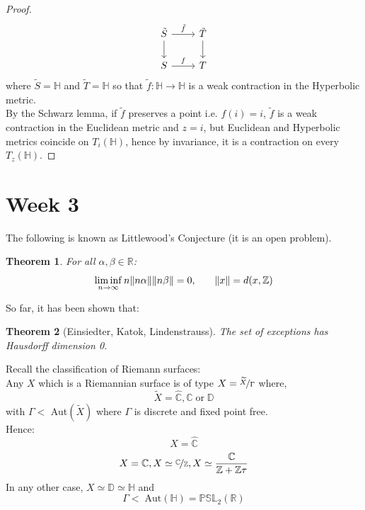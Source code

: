 \documentclass[a4paper, 11pt]{book}
\newtheorem{theorem}{Theorem}
\theoremstyle{definition}
\theoremstyle{remark}
\begin{document}
    \begin{proof}
        \begin{equation*}
            \begin{tikzcd}
                \tilde{S} \arrow{r}{\tilde{f}} \arrow{d} & \tilde{T} \arrow{d} \\
                S \arrow{r}{f} & T
            \end{tikzcd}
        \end{equation*}
        where $\tilde{S}=\mathbb{H}$ and $\tilde{T}=\mathbb{H}$ so that $\widetilde{f}: \mathbb{H}\to\mathbb{H}$ is 
        a weak contraction in the Hyperbolic metric.\\

        By the Schwarz lemma, if $\widetilde{f}$ preserves a point i.e. $f(i)=i$, $\widetilde{f}$ is a weak contraction in the
        Euclidean metric and $z=i$, but Euclidean and Hyperbolic metrics coincide on $T_i(\mathbb{H})$, hence by invariance, it is
        a contraction on every $T_z(\mathbb{H})$.
    \end{proof}

    \section{Week 3}

    The following is known as Littlewood's Conjecture (it is an open problem).
    \begin{theorem}
        For all $\alpha,\beta\in\mathbb{R}$:
        \[ \liminf_{n\to\infty} n\norm{n\alpha}\norm{n\beta} = 0,\qquad \norm{x} = d(x,\mathbb{Z}) \]
    \end{theorem}

    So far, it has been shown that:
    \begin{theorem}[Einsiedter, Katok, Lindenstrauss]
        The set of exceptions has Hausdorff dimension 0.
    \end{theorem}

    Recall the classification of Riemann surfaces:\\

    Any $X$ which is a Riemannian surface is of type $X=\nicefrac{\widetilde{X}}{\Gamma}$ where,
    \[ \widetilde{X} = \hat{\mathbb{C}},\mathbb{C}\;\text{or}\;\mathbb{D} \]
    with $\Gamma <$ Aut$(\widetilde{X})$ where $\Gamma$ is discrete and fixed point free.\\

    Hence:\\
    \[ X = \hat{\mathbb{C}} \]
    \[ X = \mathbb{C}, X\simeq \nicefrac{\mathbb{C}}{\mathbb{Z}}, X\simeq \frac{\mathbb{C}}{\mathbb{Z}+\mathbb{Z}\tau} \]
    In any other case, $X\simeq \mathbb{D}\simeq \mathbb{H}$ and
    \[ \Gamma <\;\text{Aut}(\mathbb{H}) = \mathbb{PSL}_2(\mathbb{R}) \]
\end{document}
